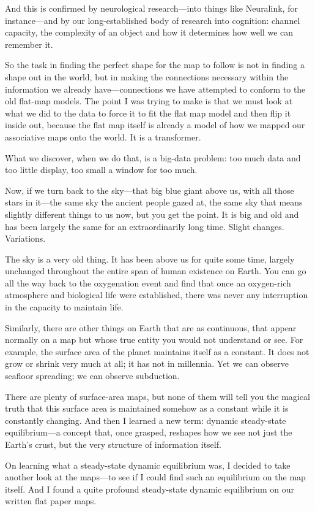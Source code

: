 And this is confirmed by neurological research—into things like Neuralink, for instance—and by our long-established body of research into cognition: channel capacity, the complexity of an object and how it determines how well we can remember it.

So the task in finding the perfect shape for the map to follow is not in finding a shape out in the world, but in making the connections necessary within the information we already have—connections we have attempted to conform to the old flat-map models. The point I was trying to make is that we must look at what we did to the data to force it to fit the flat map model and then flip it inside out, because the flat map itself is already a model of how we mapped our associative maps onto the world. It is a transformer.

What we discover, when we do that, is a big-data problem: too much data and too little display, too small a window for too much.

Now, if we turn back to the sky—that big blue giant above us, with all those stars in it—the same sky the ancient people gazed at, the same sky that means slightly different things to us now, but you get the point. It is big and old and has been largely the same for an extraordinarily long time. Slight changes. Variations.

The sky is a very old thing. It has been above us for quite some time, largely unchanged throughout the entire span of human existence on Earth. You can go all the way back to the oxygenation event and find that once an oxygen-rich atmosphere and biological life were established, there was never any interruption in the capacity to maintain life.

Similarly, there are other things on Earth that are as continuous, that appear normally on a map but whose true entity you would not understand or see. For example, the surface area of the planet maintains itself as a constant. It does not grow or shrink very much at all; it has not in millennia. Yet we can observe seafloor spreading; we can observe subduction.

There are plenty of surface-area maps, but none of them will tell you the magical truth that this surface area is maintained somehow as a constant while it is constantly changing. And then I learned a new term: dynamic steady-state equilibrium—a concept that, once grasped, reshapes how we see not just the Earth’s crust, but the very structure of information itself.

On learning what a steady-state dynamic equilibrium was, I decided to take another look at the maps—to see if I could find such an equilibrium on the map itself. And I found a quite profound steady-state dynamic equilibrium on our written flat paper maps.

